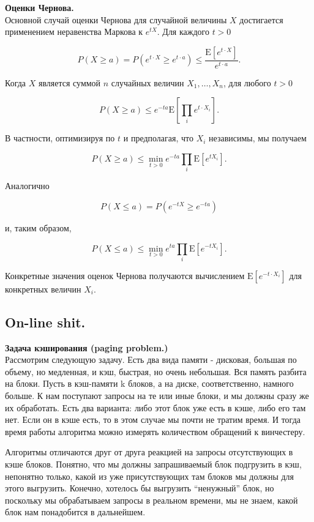 \documentclass[a4paper]{article}
\theoremstyle{indented}
\theoremstyle{definition}
\theoremstyle{remark}
\begin{document}
\textbf{Оценки Чернова.} \\

Основной случай оценки Чернова для случайной величины $X$ достигается применением неравенства Маркова к $e^{tX}$. Для каждого $t > 0$ 

$$P(X \geq a) = P(e^{t\cdot X} \geq e^{t\cdot a})  \leq \frac{\mathrm{E}\left [e^{t\cdot X}\right]}{e^{t\cdot a}}.$$

Когда $X$ является суммой $n$ случайных величин $X_1, \ldots, X_n$, для любого $t > 0$

$$P(X \geq a)  \leq e^{-ta}\mathrm{E} \left [\prod_i e^{t\cdot X_i} \right].$$

В частности, оптимизируя по $t$ и предполагая, что $X_i$ независимы, мы получаем

$$ P(X \geq a)  \leq \min_{t>0} e^{-ta} \prod_i \mathrm{E} \left [e^{tX_i} \right ].$$    

Аналогично

$$P(X \leq a) = P\left (e^{-tX} \ge e^{-ta}\right) $$

и, таким образом,

$$ P(X \leq a) \leq \min_{t>0} e^{ta} \prod_i \mathrm{E} \left[e^{-t X_i} \right ].$$

Конкретные значения оценок Чернова получаются вычислением $\mathrm{E} \left[e^{-t\cdot X_i} \right ]$ для конкретных величин $X_i$.
\\ 

\subsection{On-line shit.}

\textbf{Задача кэширования (paging problem.)} 
\\ 

Рассмотрим следующую задачу. 
Есть два вида памяти - дисковая, большая по объему, но медленная, 
и кэш, быстрая, но очень небольшая. Вся память разбита на блоки. 
Пусть в кэш-памяти k блоков, а на диске, соответственно, намного больше. 
К нам поступают запросы на те или иные блоки, 
и мы должны сразу же их обработать. 
Есть два варианта: либо этот блок уже есть в кэше, либо его там нет. 
Если он в кэше есть, то в этом случае мы почти не тратим время. 
И тогда время работы алгоритма можно измерять количеством обращений 
к винчестеру. 

Алгоритмы отличаются друг от друга реакцией на запросы отсутствующих 
в кэше блоков. Понятно, что мы должны запрашиваемый блок подгрузить в кэш, 
непонятно только, какой из уже присутствующих там блоков мы должны для этого 
выгрузить. Конечно, хотелось бы выгрузить ``ненужный'' блок, но поскольку мы 
обрабатываем запросы в реальном времени, мы не знаем, какой блок нам 
понадобится в дальнейшем. 
\end{document}
